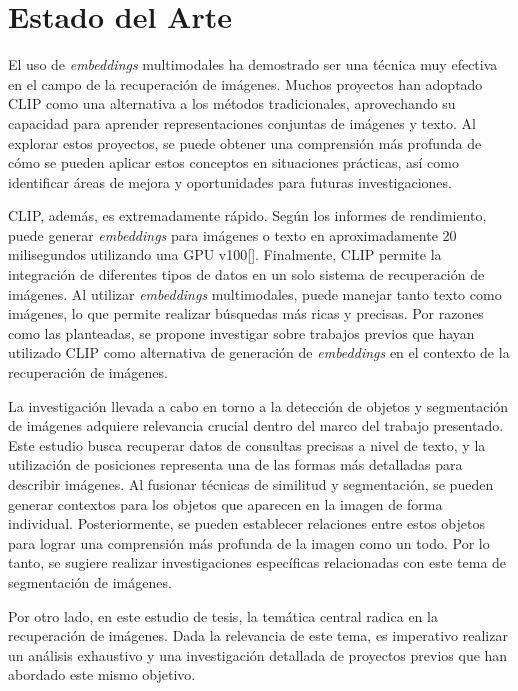 \chapter{Estado del Arte}\label{chapter:state-of-the-art}

El uso de \textit{embeddings} multimodales ha demostrado ser una técnica muy efectiva en el campo de la recuperaci\'on de im\'agenes. Muchos proyectos han adoptado CLIP como una alternativa a los métodos tradicionales, aprovechando su capacidad para aprender representaciones conjuntas de imágenes y texto. Al explorar estos proyectos, se puede obtener una comprensión más profunda de cómo se pueden aplicar estos conceptos en situaciones prácticas, así como identificar áreas de mejora y oportunidades para futuras investigaciones.

CLIP, además, es extremadamente rápido. Según los informes de rendimiento, puede generar \textit{embeddings} para imágenes o texto en aproximadamente 20 milisegundos utilizando una GPU v100[\cite{BuildingImageClip-20ms}]. Finalmente, CLIP permite la integración de diferentes tipos de datos en un solo sistema de recuperación de imágenes. Al utilizar \textit{embeddings} multimodales, puede manejar tanto texto como imágenes, lo que permite realizar búsquedas más ricas y precisas. Por razones como las planteadas, se propone investigar sobre trabajos previos que hayan utilizado CLIP como alternativa de generación de \textit{embeddings} en el contexto de la recuperación de imágenes.

La investigación llevada a cabo en torno a la detección de objetos y segmentación de imágenes adquiere relevancia crucial dentro del marco del trabajo presentado. Este estudio busca recuperar datos de consultas precisas a nivel de texto, y la utilización de posiciones representa una de las formas más detalladas para describir imágenes. Al fusionar técnicas de similitud y segmentación, se pueden generar contextos para los objetos que aparecen en la imagen de forma individual. Posteriormente, se pueden establecer relaciones entre estos objetos para lograr una comprensión más profunda de la imagen como un todo. Por lo tanto, se sugiere realizar investigaciones específicas relacionadas con este tema de segmentación de imágenes.

Por otro lado, en este estudio de tesis, la temática central radica en la recuperación de imágenes. Dada la relevancia de este tema, es imperativo realizar un análisis exhaustivo y una investigación detallada de proyectos previos que han abordado este mismo objetivo.



